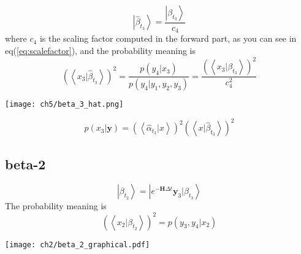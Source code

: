 \begin{definition}
\begin{equation}
        \left| \hat{\beta}_{t_{3}} \right> = \frac{ \left| \beta_{t_{3}} \right> }{ c_4 }
\end{equation}
where $c_4$ is the scaling factor computed in the forward part, as you can see in eq(\ref{eq:scalefactor}), and 
the probability meaning is
\begin{equation}
        \left(\left<x_3|\hat{\beta}_{t_{3}} \right>\right)^2 = \frac{p(y_4|x_3)}{p(y_4|y_1,y_2,y_3)} 
        =  \frac{ (\left<x_3|\beta_{t_{3}} \right>)^2 }{ c_4^2 }
\end{equation}
\begin{center}
        \texttt{[image: ch5/beta\_3\_hat.png]}
\end{center}
\begin{equation}
        p(x_3|\textbf{y}) = (\left<\hat{\alpha}_{t_{3}}|x \right>)^2 \left(\left<x|\hat{\beta}_{t_{3}} \right>\right)^2
\end{equation} 
\end{definition}

\subsection{beta-2}
\begin{definition}
\begin{equation}
        \left|\beta_{t_2}  \right> =  \left| e^{-\textbf{H}\Delta t} \textbf{y}_3 |\beta_{t_3} \right>
\end{equation}
The probability meaning is
\begin{equation}
           \left( \left<x_2 |\beta_{t_2}  \right> \right)^2 = p(y_3, y_4 | x_2)
\end{equation}
\begin{center}
        \texttt{[image: ch2/beta\_2\_graphical.pdf]}
\end{center}       
\end{definition}

